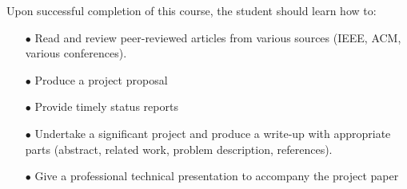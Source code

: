 Upon successful completion of this course, the student should learn how to:
\begin{itemize}
\item[$\bullet$] Read and review peer-reviewed articles from various
  sources (IEEE, ACM, various conferences).
\item[$\bullet$] Produce a project proposal
\item[$\bullet$] Provide timely status reports
\item[$\bullet$] Undertake a significant project and produce a
  write-up with appropriate parts (abstract, related work, problem
  description, references). 
\item[$\bullet$] Give a professional technical presentation to
  accompany the project paper
\end{itemize}


